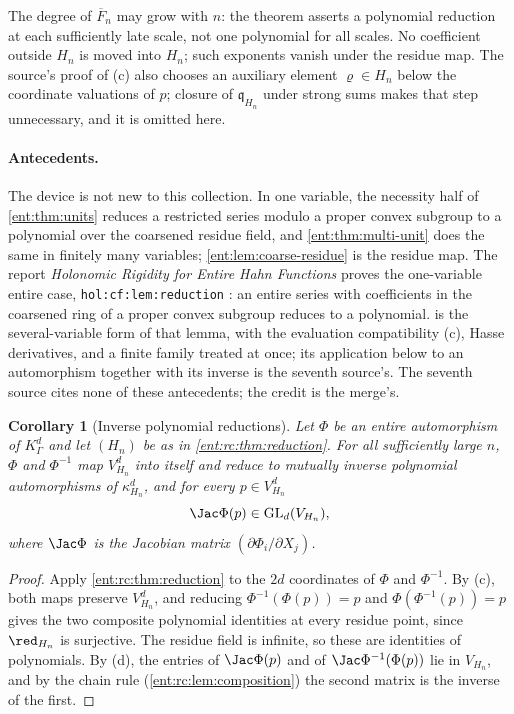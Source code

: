 \documentclass[11pt]{article}
\theoremstyle{plain}
\theoremstyle{plain}
\theoremstyle{plain}
\newtheorem{corollary}[corollary]{Corollary}
\theoremstyle{definition}
\theoremstyle{definition}
\theoremstyle{definition}
\theoremstyle{definition}
\theoremstyle{remark}
\newcommand{\K}{K_\Gamma}\newcommand{\KD}{K_\Delta}
\begin{document}
The degree of $\overline F_n$ may grow with $n$: the theorem asserts a
polynomial reduction at each sufficiently late scale, not one polynomial for
all scales. No coefficient outside $H_n$ is moved into $H_n$; such exponents
vanish under the residue map. The source's proof of (c) also chooses an
auxiliary element $\varrho\in H_n$ below the coordinate valuations of $p$;
closure of $\mathfrak q_{H_n}$ under strong sums makes that step unnecessary,
and it is omitted here.

\paragraph{Antecedents.} The device is not new to this collection. In one
variable, the necessity half of \cref{ent:thm:units} reduces a restricted
series modulo a proper convex subgroup to a polynomial over the coarsened
residue field, and \cref{ent:thm:multi-unit} does the same in finitely many
variables; \cref{ent:lem:coarse-residue} is the residue map. The report
\emph{Holonomic Rigidity for Entire Hahn Functions} proves the one-variable
entire case, \texttt{hol:cf:lem:reduction} \cite{RepoHolonomic}: an entire
series with coefficients in the coarsened ring of a proper convex subgroup
reduces to a polynomial.  is the several-variable
form of that lemma, with the evaluation compatibility (c), Hasse derivatives,
and a finite family treated at once; its application below to an automorphism
together with its inverse is the seventh source's. The seventh source cites
none of these antecedents; the credit is the merge's.

\begin{corollary}[Inverse polynomial reductions]
\label{ent:rc:cor:automorphism-reduction}
Let $\Phi$ be an entire automorphism of $\K^d$ and let $(H_n)$ be as in
\cref{ent:rc:thm:reduction}. For all sufficiently large $n$, $\Phi$ and
$\Phi^{-1}$ map $V_{H_n}^d$ into itself and reduce to mutually inverse
polynomial automorphisms of $\kappa_{H_n}^d$, and for every
$p\in V_{H_n}^d$
\begin{equation}\label{ent:rc:eq:J-unit}
 \Jac\Phi(p)\in\operatorname{GL}_d(V_{H_n}),
\end{equation}
where $\Jac\Phi$ is the Jacobian matrix $(\partial\Phi_i/\partial X_j)$.
\end{corollary}
\begin{proof}
Apply \cref{ent:rc:thm:reduction} to the $2d$ coordinates of $\Phi$ and
$\Phi^{-1}$. By (c), both maps preserve $V_{H_n}^d$, and reducing
$\Phi^{-1}(\Phi(p))=p$ and $\Phi(\Phi^{-1}(p))=p$ gives the two composite
polynomial identities at every residue point, since $\red_{H_n}$ is surjective.
The residue field is infinite, so these are identities of polynomials. By (d),
the entries of $\Jac\Phi(p)$ and of $\Jac\Phi^{-1}(\Phi(p))$ lie in
$V_{H_n}$, and by the chain rule (\cref{ent:rc:lem:composition}) the second
matrix is the inverse of the first.
\end{proof}
\end{document}
